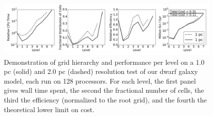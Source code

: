 \documentclass[11pt]{article}
\begin{document}

\begin{figure}
\centering
\includegraphics[width=.9\linewidth]{enzo_levels}
\caption{\small Demonstration of grid hierarchy and performance per level on a 1.0 pc (solid) and 2.0 pc (dashed) resolution test of our dwarf galaxy model, each run on 128 processors. For each level, the first panel gives wall time spent, the second the fractional number of cells, the third the efficiency (normalized to the root grid), and the fourth the theoretical lower limit on cost.}
\label{fig:levels}
\end{figure}
\end{document}

